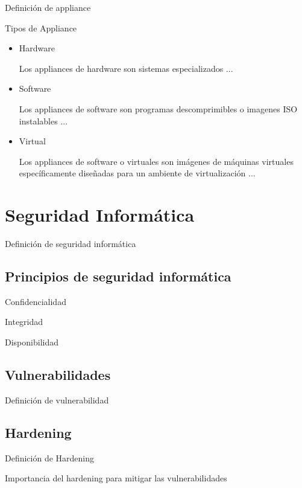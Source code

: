 Definici\'{o}n de appliance \cite{74e586f4d341588a0bcc6273c524d8f5}

Tipos de Appliance

\begin{itemize}

  \item Hardware
  
Los appliances de hardware son sistemas especializados \cite{dcd32ad713054f2f67fbcd17c0900928}...

  \item Software
  
Los appliances de software son programas descomprimibles o imagenes ISO instalables \cite{4cb5bff4c029d86b328a2126e8a3060f}...
  
  \item Virtual 
  
Los appliances de software o virtuales son im\'{a}genes de m\'{a}quinas virtuales espec\'{i}ficamente dise\~{n}adas para un ambiente de virtualizaci\'{o}n \cite{314f38cbb73bf967a21191775959cf1d}...
  
\end{itemize}

\section {Seguridad Inform\'{a}tica}
    
Definici\'{o}n de seguridad inform\'{a}tica

  \subsection {Principios de seguridad inform\'{a}tica}

Confidencialidad

Integridad

Disponibilidad

  \subsection {Vulnerabilidades}

Definici\'{o}n de vulnerabilidad

  \subsection {Hardening}

Definici\'{o}n de Hardening

Importancia del hardening para mitigar las vulnerabilidades

